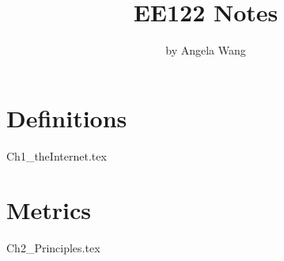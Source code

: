 \documentclass{book}
\title{EE122 Notes}
\author{by Angela Wang}
\begin{document}
\maketitle
\tableofcontents
\mainmatter

\chapter{Definitions}
{Ch1_theInternet.tex}

\chapter{Metrics}
{Ch2_Principles.tex}
\end{document}
